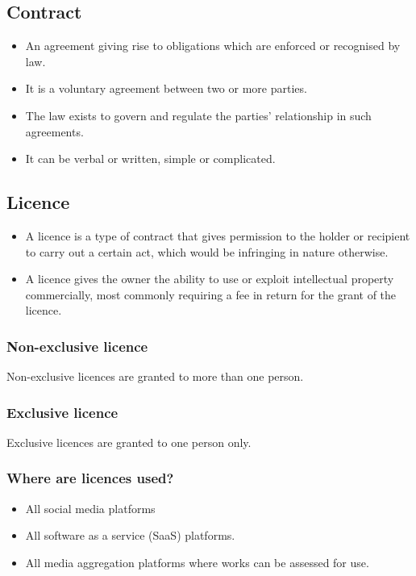 \documentclass[11pt]{article}
\begin{document}
\subsection{Contract}
\label{sec:org08a84f3}
\begin{itemize}
\item An agreement giving rise to obligations which are enforced or recognised by law.
\item It is a voluntary agreement between two or more parties.
\item The law exists to govern and regulate the parties' relationship in such agreements.
\item It can be verbal or written, simple or complicated.
\end{itemize}
\subsection{Licence}
\label{sec:org8a96706}
\begin{itemize}
\item A licence is a type of contract that gives permission to the holder or recipient to carry out a certain act, which would be infringing in nature otherwise.
\item A licence gives the owner the ability to use or exploit intellectual property commercially, most commonly requiring a fee in return for the grant of the licence.
\end{itemize}
\subsubsection{Non-exclusive licence}
\label{sec:org6ecd2d5}
Non-exclusive licences are granted to more than one person.
\subsubsection{Exclusive licence}
\label{sec:org6718c20}
Exclusive licences are granted to one person only.
\subsubsection{Where are licences used?}
\label{sec:org54e0928}
\begin{itemize}
\item All social media platforms
\item All software as a service (SaaS) platforms.
\item All media aggregation platforms where works can be assessed for use.
\end{itemize}
\end{document}

